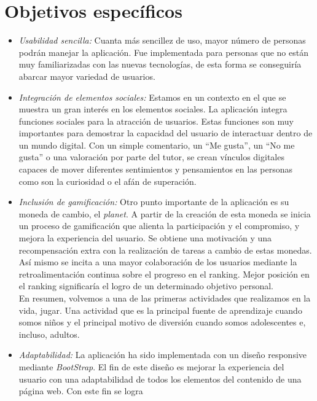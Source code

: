 \documentclass[a4paper, 12pt]{book}
\begin{document}
\section{Objetivos espec\'ificos}
\label{sec:objetivos-especificos}
\begin{itemize}
  \item \textit {Usabilidad sencilla:} Cuanta m\'as sencillez de uso, mayor n\'umero de personas podr\'an manejar la aplicaci\'on. 
  Fue implementada para personas que no est\'an muy familiarizadas con las nuevas tecnolog\'ias, de esta forma se conseguir\'ia 
  abarcar mayor variedad de usuarios.
  \item \textit {Integraci\'on de elementos sociales:} Estamos en un contexto en el que se muestra un gran inter\'es en los elementos sociales. La aplicaci\'on
  integra funciones sociales para la atracci\'on de usuarios. Estas funciones son muy importantes para demostrar la capacidad del usuario 
  de interactuar dentro de un mundo digital. Con un simple comentario, un ``Me gusta'', un ``No me gusta'' o una valoraci\'on por parte del 
  tutor, se crean v\'inculos digitales capaces de mover diferentes sentimientos y pensamientos en las personas como son la curiosidad o el 
  af\'an de superaci\'on.
  \item \textit {Inclusi\'on de gamificaci\'on:} Otro punto importante de la aplicaci\'on es su moneda de cambio, el \textit{planet}. A 
  partir de la creaci\'on de esta moneda se inicia un proceso de gamificaci\'on que alienta la participaci\'on y el compromiso, y mejora la 
  experiencia del usuario. 
  Se obtiene una motivaci\'on y una recompensaci\'on extra con la realizaci\'on de tareas a cambio de estas monedas. As\'i mismo se incita a una 
  mayor colaboraci\'on de los usuarios mediante la retroalimentaci\'on continua sobre el progreso en el ranking. Mejor posici\'on en el ranking 
  significar\'ia el logro de un determinado objetivo personal.\\
  En resumen, volvemos a una de las primeras actividades que realizamos en la vida, jugar. Una actividad que es la principal fuente de 
  aprendizaje cuando somos ni\~nos y el principal motivo de diversi\'on cuando somos adolescentes e, incluso, adultos.
  \item \textit {Adaptabilidad:} La aplicaci\'on ha sido implementada con un dise\~no responsive mediante \textit{BootStrap}. El fin de este dise\~no 
  es mejorar la experiencia del usuario con una adaptabilidad de todos los elementos del contenido de una p\'agina web. Con este fin se logra 

\end{itemize}
\end{document}

